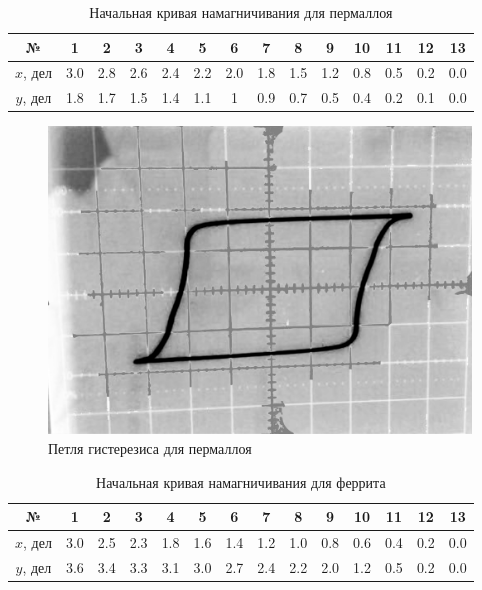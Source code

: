 \documentclass[12pt]{kiarticle} %
\begin{document}
\begin{enumerate}
		\begin{table}[h!]
		\caption{Начальная кривая намагничивания для пермаллоя}
		\begin{center}
			\begin{tabular}{|c|c|c|c|c|c|c|c|c|c|c|c|c|c|} 
				\hline 
				№ &  1 &  2 & 3 & 4 & 5 &  6 &  7 & 8 & 9 & 10  &  11 &  12 &13   \\ 	\hline
				
			$ x $, дел & 3.0 & 2.8 & 2.6 & 2.4 & 2.2 & 2.0 & 1.8 & 1.5 & 1.2 & 0.8 & 0.5 & 0.2 & 0.0 \\
			 $ y $, дел & 1.8 & 1.7 & 1.5 & 1.4 & 1.1 & 1 & 0.9 & 0.7 & 0.5 & 0.4 & 0.2 & 0.1 & 0.0 \\
				\hline
				
			\end{tabular}
		\end{center}
	\end{table}


	\begin{figure}[h!]
	\includegraphics[scale=0.2]{2.png}
	\caption{Петля гистерезиса для пермаллоя}
\end{figure}

  		
  		\begin{table}[h!]
  		\caption{Начальная кривая намагничивания для феррита}
  		\begin{center}
  			\begin{tabular}{|c|c|c|c|c|c|c|c|c|c|c|c|c|c|} 
  				\hline 
  				№ &  1 &  2 & 3 & 4 & 5 &  6 &  7 & 8 & 9 & 10  &  11 &  12 &13   \\ 	\hline
  				
  			$ x $, дел &3.0 & 2.5 & 2.3 & 1.8 & 1.6 & 1.4 & 1.2 & 1.0 & 0.8 & 0.6 & 0.4 & 0.2 & 0.0 \\
  			 $ y $, дел & 3.6 & 3.4 & 3.3 & 3.1 & 3.0 & 2.7 & 2.4 & 2.2 & 2.0 & 1.2 & 0.5 & 0.2 & 0.0 \\
  				\hline
  				

\end{tabular}
\end{center}
\end{table}
\end{enumerate}
\end{document}
